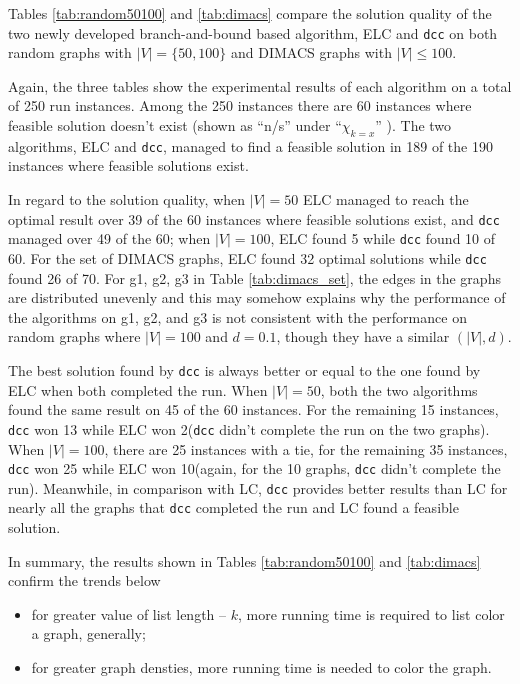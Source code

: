 \documentclass[10pt]{article}
\begin{document}
Tables \ref{tab:random50100} and \ref{tab:dimacs} compare the solution quality of the two
newly developed branch-and-bound based algorithm,  ELC and \texttt{dcc} on both random graphs with $|V| = \{50, 100 \}$ and DIMACS graphs
with $|V| \leq 100$.

Again, the three tables show the experimental results of each algorithm on a total of 250 run instances. Among 
 the 250 instances there are 60 instances where feasible solution doesn't exist (shown as ``n/s'' under ``$\chi_{k=x}$'' ).
The two algorithms, ELC and \texttt{dcc}, managed to find a feasible solution in 189 of the 190 instances where 
feasible solutions exist. 

In regard to the solution quality, when $|V| = 50$ ELC managed to reach the optimal result over 39 of the 60 
instances where feasible solutions exist, and \texttt{dcc} managed over 49 of the 60; when $|V| = 100$, ELC found 5 while \texttt{dcc} found 
10 of 60. For the set of DIMACS graphs, ELC found 32 optimal solutions while \texttt{dcc} found 26 of 70. For g1, g2, g3 in 
Table \ref{tab:dimacs_set}, the edges in the graphs are distributed unevenly and this may somehow explains why the performance
of the algorithms on g1, g2, and g3 is not consistent with the performance on random graphs where $|V| = 100$ and $d = 0.1$, though they have a similar $(|V|, d)$. 

The best solution found by \texttt{dcc} is always better or equal to the one found by ELC when both completed the run.
When $|V| = 50$, both the two algorithms found the same result  on 45 of the 60 instances. For the remaining 15 instances, \texttt{dcc} won 13 while ELC won 2(\texttt{dcc}
didn't complete the run on the two graphs). When $|V| = 100$, there are 25 instances with a tie, for the remaining 35 instances, \texttt{dcc} won 25 while ELC won 10(again, for the 10 graphs, \texttt{dcc} didn't complete the run). Meanwhile, in comparison with LC, \texttt{dcc} provides better results than LC for nearly all the graphs that \texttt{dcc} completed the run and LC found a feasible solution.  

In summary, the results shown in Tables \ref{tab:random50100} and \ref{tab:dimacs} confirm the trends below
\begin{itemize}
\item for greater value of list length -- $k$, more running time is
required to list color a graph, generally; 
\item for greater graph densties, more running time is needed
  to color the graph.
\end{itemize}
\end{document}
